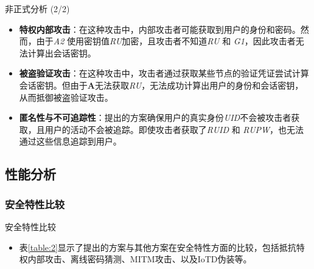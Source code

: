 \documentclass{beamer}
\begin{document}
\begin{frame}{非正式分析 (2/2)}
    \begin{itemize}
        \item \textbf{特权内部攻击}：在这种攻击中，内部攻击者可能获取到用户的身份和密码。然而，由于\textit{A2} 使用密钥值\textit{RU}加密，且攻击者不知道\textit{RU} 和 \textit{G1}，因此攻击者无法计算出会话密钥。
        
        \item \textbf{被盗验证攻击}：在这种攻击中，攻击者通过获取某些节点的验证凭证尝试计算会话密钥。但由于\textbf{A}无法获取\textit{RU}，无法成功计算出用户的身份和会话密钥，从而抵御被盗验证攻击。
        
        \item \textbf{匿名性与不可追踪性}：提出的方案确保用户的真实身份\textit{UID}不会被攻击者获取，且用户的活动不会被追踪。即使攻击者获取了\textit{RUID} 和 \textit{RUPW}，也无法通过这些信息追踪到用户。
    \end{itemize}
\end{frame}

\subsection{性能分析}
\subsubsection{安全特性比较}
\begin{frame}{安全特性比较}
    \begin{itemize}
        \item 表\ref{table:2}显示了提出的方案与其他方案在安全特性方面的比较，包括抵抗特权内部攻击、离线密码猜测、MITM攻击、以及IoTD伪装等。
    \end{itemize}
    \begin{table}[ht]
        \centering
        \caption{不同方案的安全特性比较}
        \label{table:2}
    \end{table}
\end{frame}
\end{document}
